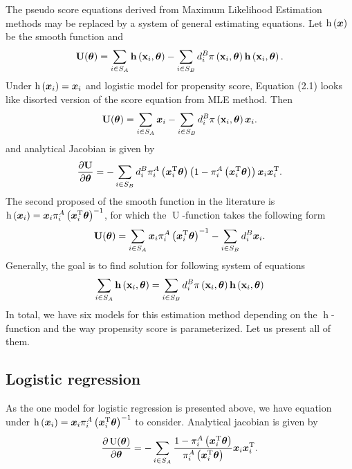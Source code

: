 \documentclass[
  letterpaper,
  DIV=11,
  numbers=noendperiod]{scrreprt}
\begin{document}
The pseudo score equations derived from Maximum Likelihood Estimation
methods may be replaced by a system of general estimating equations. Let
\(\operatorname{h}\left(\boldsymbol{x}\right)\) be the smooth function and \[
\begin{equation}
\mathbf{U}(\btheta)=\sum_{i \in S_A} \mathbf{h}\left(\mathbf{x}_i, \btheta\right)-\sum_{i \in S_B} d_i^B \pi\left(\mathbf{x}_i, \btheta\right) \mathbf{h}\left(\mathbf{x}_i, \btheta\right).
\end{equation}
\] Under \(\operatorname{h}\left(\boldsymbol{x}_i\right) = \boldsymbol{x}_i\) and logistic
model for propensity score, Equation (2.1) looks like disorted version
of the score equation from MLE method. Then \[
    \mathbf{U}(\boldsymbol{\theta})=\sum_{i \in S_A} \boldsymbol{x}_i -\sum_{i \in S_B} d_i^B \pi\left(\mathbf{x}_i, \boldsymbol{\theta}\right) \boldsymbol{x}_i.
\] and analytical Jacobian is given by \[
\frac{\partial \mathbf{U}}{\partial\boldsymbol{\theta}} = - \sum_{i \in S_B} d_i^B \pi_i^A\left(\boldsymbol{x}_i^{\mathrm{T}} \boldsymbol{\theta} \right) \left(1 -  \pi_i^A\left(\boldsymbol{x}_i^{\mathrm{T}} \boldsymbol{\theta} \right)\right)\boldsymbol{x}_i \boldsymbol{x}_i^{\mathrm{T}}.
\] The second proposed of the smooth function in the literature is
\(\operatorname{h}\left(\boldsymbol{x}_i\right) = \boldsymbol{x}_i \pi_i^A\left(\boldsymbol{x}_i^{\mathrm{T}} \boldsymbol{\theta} \right)^{-1}\),
for which the \(\operatorname{U}\)-function takes the following form \[
    \mathbf{U}(\boldsymbol{\theta})=\sum_{i \in S_A}  \boldsymbol{x}_i \pi_i^A\left(\boldsymbol{x}_i^{\mathrm{T}} \boldsymbol{\theta} \right)^{-1} -\sum_{i \in S_B} d_i^B \boldsymbol{x}_i.
\] Generally, the goal is to find solution for following system of
equations \[
\begin{equation*}
    \sum_{i \in S_A} \mathbf{h}\left(\mathbf{x}_i, \btheta\right) = \sum_{i \in S_B} d_i^B \pi\left(\mathbf{x}_i, \btheta\right) \mathbf{h}\left(\mathbf{x}_i, \btheta\right)
\end{equation*}
\] In total, we have six models for this estimation method depending on
the \(\operatorname{h}\)-function and the way propensity score is
parameterized. Let us present all of them.

\hypertarget{logistic-regression-1}{%
\subsection{Logistic regression}\label{logistic-regression-1}}

As the one model for logistic regression is presented above, we have
equation under
\(\operatorname{h}\left(\boldsymbol{x}_i\right) = \boldsymbol{x}_i \pi_i^A\left(\boldsymbol{x}_i^{\mathrm{T}} \boldsymbol{\theta} \right)^{-1}\)
to consider. Analytical jacobian is given by \[
    \frac{\partial \operatorname{U}(\boldsymbol{\theta})}{\partial \boldsymbol{\theta}} = -\sum_{i \in S_A} \frac{1 - \pi_i^A\left(\boldsymbol{x}_i^{\mathrm{T}} \boldsymbol{\theta} \right)}{\pi_i^A\left(\boldsymbol{x}_i^{\mathrm{T}} \boldsymbol{\theta} \right)} \boldsymbol{x}_i \boldsymbol{x}_i^{\mathrm{T}}.
\]
\end{document}
